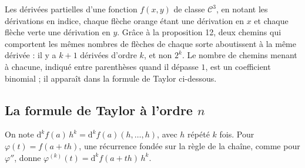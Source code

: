 \documentclass[a4paper,twoside]{report}
\newcommand{\dd}{\mathrm{d}}                      %
\newcommand{\Cc}{\mathcal{C}}                     %
\newcommand{\dpd}[2]{\dfrac{\partial #1}{\partial #2}}  %
\begin{document}
\begin{center}
\end{center}

\noindent Les dérivées partielles d'une fonction $f(x, y)$ de classe $\Cc^{3}$, en notant les dérivations en indice, chaque flèche orange étant une dérivation en $x$ et chaque flèche verte une dérivation en $y$. Grâce à la proposition 12, deux chemins qui comportent les mêmes nombres de flèches de chaque sorte aboutissent à la même dérivée : il y a $k + 1$ dérivées d'ordre $k$, et non $2^{k}$. Le nombre de chemins menant à chacune, indiqué entre parenthèses quand il dépasse $1$, est un coefficient binomial ; il apparaît dans la formule de Taylor ci-dessous.

\subsection{La formule de Taylor à l'ordre \texorpdfstring{$n$}{n}}

On note $\dd^{k} f(a)\,h^{k} = \dd^{k} f(a)(h, \dots, h)$, avec $h$ répété $k$ fois. Pour $\varphi(t) = f(a + th)$, une récurrence fondée sur la règle de la chaîne, comme pour $\varphi''$, donne $\varphi^{(k)}(t) = \dd^{k} f(a + th)\,h^{k}$.
\end{document}
